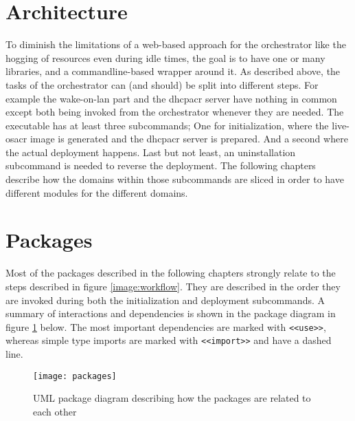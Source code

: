 \section{Architecture}
To diminish the limitations of a web-based approach for the orchestrator like the hogging of resources even during idle times, the goal is to have one or many libraries, and a commandline-based wrapper around it.
\newline
As described above, the tasks of the orchestrator can (and should) be split into different steps. For example the wake-on-lan part and the \gls{dhcpacr} server have nothing in common except both being invoked from the orchestrator whenever they are needed.
\newline
The executable has at least three subcommands; One for initialization, where the live-\gls{osacr} image is generated and the \gls{dhcpacr} server is prepared. And a second where the actual deployment happens. Last but not least, an uninstallation subcommand is needed to reverse the deployment.
\newline
The following chapters describe how the domains within those subcommands are sliced in order to have different modules for the different domains.

\section{Packages}
Most of the packages described in the following chapters strongly relate to the steps described in figure \ref{image:workflow}. They are described in the order they are invoked during both the initialization and deployment subcommands. A summary of interactions and dependencies is shown in the package diagram in figure \ref{image:packages} below. The most important dependencies are marked with \texttt{<<use>>}, whereas simple type imports are marked with \texttt{<<import>>} and have a dashed line.

\begin{figure}[H]
  \texttt{[image: packages]}
  \centering
  \caption{UML package diagram describing how the packages are related to each other}
  \label{image:packages}
\end{figure}

